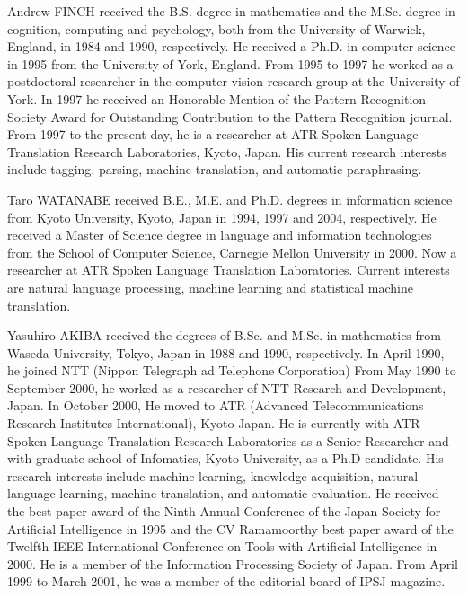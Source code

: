  \begin{biography}
 
\biotitle{}

{  
Andrew FINCH received the B.S. degree in mathematics  and the M.Sc. degree in
cognition, computing and psychology, both from the University of Warwick, England, in 1984 and 1990,
respectively. He received a Ph.D. in computer science in 1995 from the University of York, England. From 1995 to
1997 he worked as a postdoctoral researcher in the computer vision research group at the University of York. In
1997 he received an Honorable Mention of the Pattern Recognition Society Award for Outstanding Contribution to
the Pattern Recognition journal. From 1997 to the present day, he is a researcher at ATR Spoken Language
Translation Research Laboratories, Kyoto, Japan. His current research interests include tagging, parsing,
machine translation, and automatic paraphrasing.  
}

{
Taro WATANABE received B.E., M.E. and Ph.D. degrees in information science from Kyoto
University, Kyoto, Japan in 1994, 1997 and 2004, respectively. He received a Master of
Science degree in language and information technologies from the School of
Computer Science, Carnegie Mellon University in 2000.
Now a researcher at ATR Spoken Language Translation
Laboratories. Current interests are natural language processing,
machine learning and statistical machine translation.
}

{
Yasuhiro AKIBA received the degrees of B.Sc. and M.Sc. in mathematics
from  Waseda University, Tokyo, Japan in 1988 and 1990, respectively.
In April 1990, he joined NTT (Nippon Telegraph ad Telephone Corporation)
From May 1990 to September 2000, he worked as a researcher of NTT
Research and Development, Japan. In October 2000, He moved to ATR
(Advanced Telecommunications Research Institutes International), Kyoto
Japan. He is currently with ATR Spoken Language Translation Research
Laboratories as a Senior Researcher and with graduate school of
Infomatics, Kyoto University, as a Ph.D candidate.
His research interests include machine learning, knowledge
acquisition, natural language learning, machine translation, 
and automatic evaluation.
He received the best paper award of the Ninth Annual Conference
of the Japan Society for Artificial Intelligence in 1995 and 
the CV Ramamoorthy best paper award of the Twelfth IEEE International
Conference on Tools with Artificial Intelligence in 2000. 
He is a member of the Information Processing Society of Japan. 
From April 1999 to March 2001, he was a member of the editorial board
of IPSJ magazine. 
}


\end{biography}
